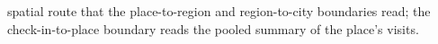 spatial route that the place-to-region and region-to-city boundaries read; the
check-in-to-place boundary reads the pooled summary of the place's visits.

%


